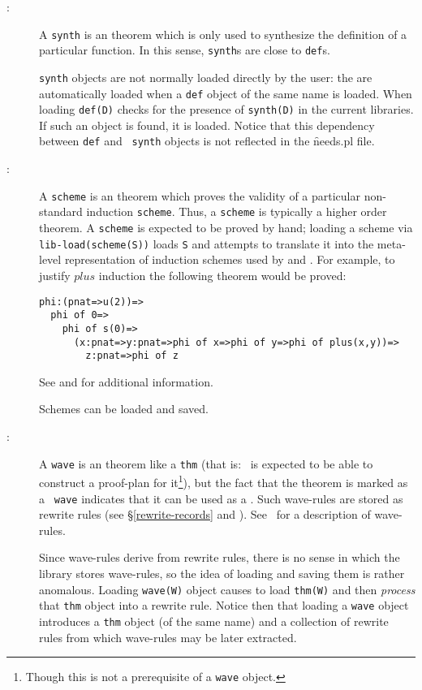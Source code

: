 \begin{description}
\item[{\tt {}}:]
A {\tt synth} is an \oyster theorem which is only used to synthesize
the definition of a particular function. In this sense, {\tt synth}s
are close to {\tt def}s.

{\tt synth} objects are not normally loaded directly by the user: the
are automatically loaded when a {\tt def} object of the same name is
loaded.  When loading {\tt def(D)} \clam checks for the presence of
{\tt synth(D)} in the current libraries.  If such an object is found,
it is loaded.  Notice that this dependency between {\tt def} and {\tt
synth} objects is not reflected in the \f{needs.pl} file.

\item[{\tt {}}:]
A {\tt scheme} is an \oyster theorem which proves the validity of a
particular non-standard induction {\tt scheme}. Thus, a {\tt scheme}
is typically a higher order theorem. A {\tt scheme} is expected to be
proved by hand;  loading a scheme via {\tt lib-load(scheme(S))} loads
{\tt S} and attempts to translate it into the meta-level
representation of induction schemes used by  and
.
For example, to justify
$plus$ induction the following theorem would be proved:
\begin{verbatim}
phi:(pnat=>u(2))=>
  phi of 0=>
    phi of s(0)=>
      (x:pnat=>y:pnat=>phi of x=>phi of y=>phi of plus(x,y))=>
        z:pnat=>phi of z
\end{verbatim}
See  and  for additional information.

Schemes can be loaded and saved.

\item[{\tt {}}:]
A {\tt wave} is an \oyster theorem like a
{\tt thm} (that is: \clam\ is expected to be able to construct a
proof-plan for it\footnote{Though this is not a prerequisite of a {\tt wave} object.}), but the fact that the theorem is marked as a {\tt
wave} indicates that it can be used as a .  Such
wave-rules are stored as rewrite rules (see \S\ref{rewrite-records}
and ). See~\cite{pub567,BasinWalsh94} for a
description of wave-rules.

Since wave-rules derive from rewrite rules, there is no sense in which
the library stores wave-rules, so the idea of loading and saving them
is rather anomalous.  Loading {\tt wave(W)} object causes \clam to
load {\tt thm(W)} and then {\em process\/} that {\tt thm} object into
a rewrite rule.  Notice then that loading a {\tt wave} object
introduces a {\tt thm} object (of the same name) and a collection of
rewrite rules from which wave-rules may be later extracted.


\end{description}
